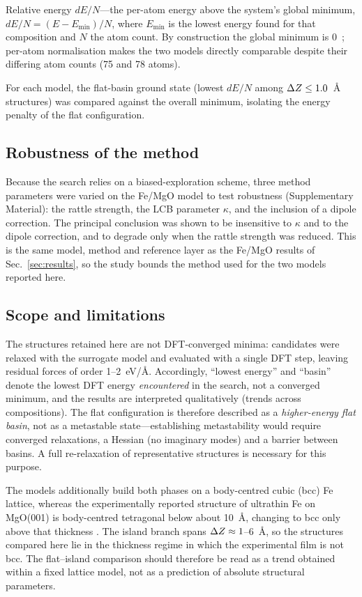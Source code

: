 Relative energy $dE/N$---the per-atom energy above the system's global minimum,
$dE/N = (E - E_\text{min})/N$, where $E_\text{min}$ is the lowest energy found for that composition
and $N$ the atom count. By construction the global minimum is $0$~\eVA; per-atom normalisation makes
the two models directly comparable despite their differing atom counts (75 and 78 atoms).

For each model, the flat-basin ground state (lowest $dE/N$ among $\Delta Z \le 1.0$~\AA{}
structures) was compared against the overall minimum, isolating the energy penalty of the flat
configuration.

\subsection{Robustness of the method}
\label{sec:robustness}

Because the search relies on a biased-exploration scheme, three method parameters were varied on the
Fe/MgO model to test robustness (Supplementary Material): the rattle strength, the LCB parameter
$\kappa$, and the inclusion of a dipole correction. The principal conclusion was shown to be
insensitive to $\kappa$ and to the dipole correction, and to degrade only when the rattle strength
was reduced. This is the same model, method and reference layer as the Fe/MgO results of
Sec.~\ref{sec:results}, so the study bounds the method used for the two models reported here.

\subsection{Scope and limitations}
\label{sec:scope}

The structures retained here are not DFT-converged minima: candidates were relaxed with the
surrogate model and evaluated with a single DFT step, leaving residual forces of order
1--2~eV/\AA. Accordingly, ``lowest energy'' and ``basin'' denote the lowest DFT energy
\emph{encountered} in the search, not a converged minimum, and the results are interpreted
qualitatively (trends across compositions). The flat configuration is therefore described as a
\emph{higher-energy flat basin}, not as a metastable state---establishing metastability would require
converged relaxations, a Hessian (no imaginary modes) and a barrier between basins. A full
re-relaxation of representative structures is necessary for this purpose.

The models additionally build both phases on a body-centred cubic (bcc) Fe lattice, whereas the
experimentally reported structure of ultrathin Fe on MgO(001) is body-centred tetragonal
below about 10~\AA, changing to bcc only above that thickness \cite{urano1988}. The island branch
spans $\Delta Z \approx 1$--$6$~\AA, so the structures compared here lie in the thickness regime in which
the experimental film is not bcc. The flat--island comparison should therefore be read as a trend
obtained within a fixed lattice model, not as a prediction of absolute structural parameters.

